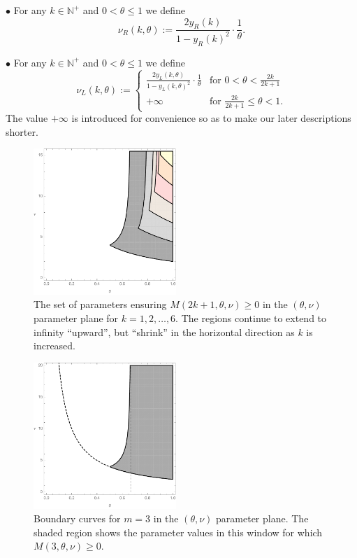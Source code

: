 \documentclass[a4paper]{article}
\newcommand{\te}{\theta}
\newcommand{\nul}{\nu_L(k,\theta)}
\newcommand{\nur}{\nu_R(k,\theta)}
\newcommand{\yl}{y_L(k,\theta)}
\newcommand{\yr}{y_R(k)}
\newcommand{\nplus}{\mathbb{N}^+}
\begin{document}
$\bullet$ For any $k\in\nplus$ and $0<\te\le 1$ we define
\[\nur:=\frac{2\yr}{1-\yr^2}\cdot \frac{1}{\te}.\]

$\bullet$ For any $k\in\nplus$ and $0<\te\le 1$ we define
\[\nul:=\begin{cases}
 \frac{2\yl}{1-\yl^2}\cdot \frac{1}{\te} & \text{for } 0<\te<\frac{2k}{2k+1}\\
 +\infty & \text{for } \frac{2k}{2k+1}\le \te<1.
\end{cases}\]
The value $+\infty$ is introduced for convenience so as to make our later descriptions shorter.



\begin{figure}
\begin{center}
\includegraphics[width=0.48\textwidth]{fig_variousk.pdf}
\caption{The set of parameters ensuring $M(2k+1,\te,\nu)\ge 0$ in the $(\te,\nu)$ parameter plane for $k=1, 2, \ldots, 6$. The regions continue to extend to infinity ``upward'', but ``shrink'' in the horizontal direction as $k$ is increased.}\label{fig_variousk}
\end{center}
\end{figure}



\begin{figure}
\begin{center}
\includegraphics[width=0.48\textwidth]{fig_boundary.pdf}
\caption{Boundary curves for $m=3$ in the $(\te,\nu)$ parameter plane. The shaded region shows the parameter values in this window for which $M(3,\te,\nu)\ge 0$.}\label{fig_boundary}
\end{center}
\end{figure}
\end{document}
